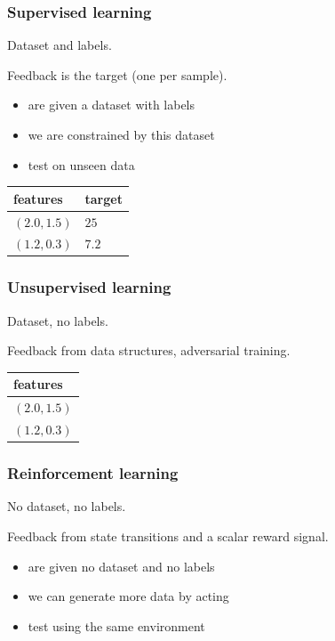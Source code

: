 \documentclass[]{article}
\providecommand{\tightlist}{%
  \setlength{\itemsep}{0pt}\setlength{\parskip}{0pt}}
\begin{document}
\hypertarget{supervised-learning}{%
\subsubsection{Supervised learning}\label{supervised-learning}}

Dataset and labels.

Feedback is the target (one per sample).

\begin{itemize}
\tightlist
\item
  are given a dataset with labels
\item
  we are constrained by this dataset
\item
  test on unseen data
\end{itemize}

\begin{longtable}[]{@{}ll@{}}
\toprule
features & target\tabularnewline
\midrule
\endhead
\((2.0, 1.5)\) & \(25\)\tabularnewline
\((1.2, 0.3)\) & \(7.2\)\tabularnewline
\bottomrule
\end{longtable}

\hypertarget{unsupervised-learning}{%
\subsubsection{Unsupervised learning}\label{unsupervised-learning}}

Dataset, no labels.

Feedback from data structures, adversarial training.

\begin{longtable}[]{@{}l@{}}
\toprule
features\tabularnewline
\midrule
\endhead
\((2.0, 1.5)\)\tabularnewline
\((1.2, 0.3)\)\tabularnewline
\bottomrule
\end{longtable}

\hypertarget{reinforcement-learning}{%
\subsubsection{Reinforcement learning}\label{reinforcement-learning}}

No dataset, no labels.

Feedback from state transitions and a scalar reward signal.

\begin{itemize}
\tightlist
\item
  are given no dataset and no labels
\item
  we can generate more data by acting
\item
  test using the same environment
\end{itemize}
\end{document}
